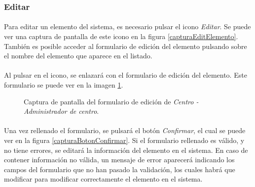 \subsubsection{Editar}

  \paragraph{}Para editar un elemento del sistema, es necesario pulsar el
  icono \textit{Editar}. Se puede ver una captura de pantalla de este
  icono en la figura \ref{capturaEditElemento}. También es posible acceder
  al formulario de edición del elemento pulsando sobre el nombre del elemento
  que aparece en el listado.

  \paragraph{}Al pulsar en el icono, se enlazará con el formulario de edición
  del elemento. Este formulario se puede ver en la imagen
  \ref{capturaEditCentroAdministradorCentro}.

  \begin{figure}[!ht]
    \begin{center}
      \caption{Captura de pantalla del formulario de edición de \textit{Centro - Administrador de centro}.}
      \label{capturaEditCentroAdministradorCentro}
    \end{center}
  \end{figure}

  \paragraph{}Una vez rellenado el formulario, se pulsará el botón
  \textit{Confirmar}, el cual se puede ver en la figura
  \ref{capturaBotonConfirmar}. Si el formulario rellenado es válido, y no tiene
  errores, se editará la información del elemento en el sistema. En caso de
  contener información no válida, un mensaje de error aparecerá indicando los
  campos del formulario que no han pasado la validación, los cuales habrá que
  modificar para modificar correctamente el elemento en el sistema.
